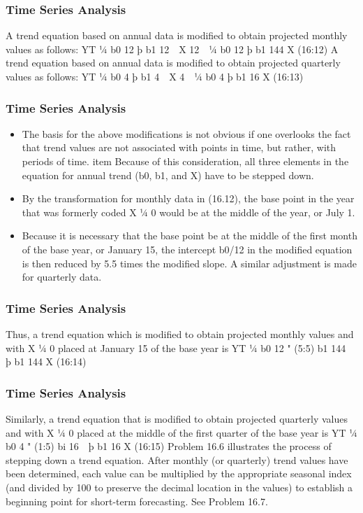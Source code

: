 \begin{frame}
\frametitle{Time Series Analysis}A trend equation based on annual
data is modified to obtain projected monthly values as follows:
YT ¼
b0
12
þ
b1
12   X
12   ¼
b0
12
þ
b1
144
X (16:12)
A trend equation based on annual data is modified to obtain projected quarterly values as follows:
YT ¼
b0
4
þ
b1
4   X
4   ¼
b0
4
þ
b1
16
X (16:13)

\end{frame}
\begin{frame}
\frametitle{Time Series Analysis}
\begin{itemize}
\item The basis for the above modifications is not obvious if one overlooks the fact that trend values are not
associated with points in time, but rather, with periods of time. 
item Because of this consideration, all three elements
in the equation for annual trend (b0, b1, and X) have to be stepped down.
\item By the transformation for monthly data in (16.12), the base point in the year that was formerly coded X ¼ 0
would be at the middle of the year, or July 1. 
\item Because it is necessary that the base point be at the middle of the
first month of the base year, or January 15, the intercept b0/12 in the modified equation is then reduced by 5.5
times the modified slope. A similar adjustment is made for quarterly data. 
\end{itemize}

\end{frame}
\begin{frame}
\frametitle{Time Series Analysis}
Thus, a trend equation which is
modified to obtain projected monthly values and with X ¼ 0 placed at January 15 of the base year is
YT ¼
b0
12
" (5:5)
b1
144   þ
b1
144
X (16:14)
\end{frame}
\begin{frame}
\frametitle{Time Series Analysis}
Similarly, a trend equation that is modified to obtain projected quarterly values and with X ¼ 0 placed at the
middle of the first quarter of the base year is
YT ¼
b0
4
" (1:5)
bi
16   þ
b1
16
X (16:15)
Problem 16.6 illustrates the process of stepping down a trend equation. After monthly (or quarterly) trend
values have been determined, each value can be multiplied by the appropriate seasonal index (and divided by
100 to preserve the decimal location in the values) to establish a beginning point for short-term forecasting.
See Problem 16.7.

\end{frame}
